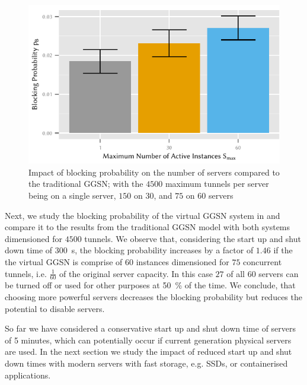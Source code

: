 \begin{figure}
  \centering
  \includegraphics{cloud/virtualized_network_functions/performance_evaluation/figures/blocking_comparison}
  \caption{Impact of blocking probability on the number of servers compared to the traditional \gls{GGSN}; with the \(4500\) maximum tunnels per server being on a single server, \(150\) on \(30\), and \(75\) on \(60\) servers}
  \label{fig:cloud:virtualized_network_functions:performance_evaluation:virtual_ggsn:blocking_comparison}
\end{figure}

Next, we study the blocking probability of the virtual \gls{GGSN} system in  and compare it to the results from the traditional \gls{GGSN} model with both systems dimensioned for \(4500\) tunnels.
We observe that, considering the start up and shut down time of \SI{300}{\second}, the blocking probability increases by a factor of \(1.46\) if the the virtual \gls{GGSN} is comprise of \(60\) instances dimensioned for \(75\) concurrent tunnels, i.e. \(\frac{1}{60}\) of the original server capacity.
In this case \(27\) of all \(60\) servers can be turned off or used for other purposes at \SI{50}{\percent} of the time.
We conclude, that choosing more powerful servers decreases the blocking probability but reduces the potential to disable servers.

So far we have considered a conservative start up and shut down time of servers of 5 minutes, which can potentially occur if current generation physical servers are used.
In the next section we study the impact of reduced start up and shut down times with modern servers with fast storage, e.g. \glspl{SSD}, or containerised applications.

